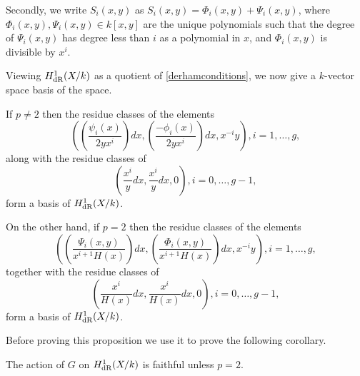 Secondly, we write $S_i(x,y)$ as $S_i(x,y) = \Phi_i(x,y) + \Psi_i(x,y)$, where $\Phi_i(x,y), \Psi_i(x,y) \in k[x,y]$ are the unique polynomials such that the degree of $\Psi_i(x,y)$ has degree less than $i$ as a polynomial in $x$, and $\Phi_i(x,y)$ is divisible by $x^i$.

Viewing $H_{\text {dR}}^1(X/k)$ as a quotient of \eqref{derhamconditions}, we now give a $k$-vector space basis of the space.
\begin{thm}\label{basis}

If $p \neq 2$ then the residue classes of the elements 
\begin{equation}\label{one}
 \left( \left( \frac{\psi_i(x)}{2yx^i}\right) dx, \left(\frac{-\phi_i(x)}{2yx^i}\right) dx, x^{-i}y\right), i=1, \ldots ,g,
\end{equation}
along with the residue classes of 
\begin{equation}\label{two}
 \left( \frac{x^{i}}{y} dx , \frac{x^{i}}{y} dx, 0 \right), i = 0,\ldots ,g-1,
\end{equation}
form a basis of $H_{\text {dR}}^1(X/k)$.

On the other hand, if $p=2$ then the residue classes of the elements 
\begin{equation}\label{three}
\left( \left(\frac{\Psi_i(x,y)}{x^{i+1}H(x)}\right) dx, \left( \frac{\Phi_i(x,y)}{x^{i+1}H(x)} \right) dx, x^{-i}y \right), i =1, \ldots , g,
\end{equation}
together with the residue classes of 
\begin{equation}\label{four}
\left( \frac{x^{i}}{H(x)} dx, \frac{x^{i}}{H(x)} dx, 0 \right), i=0, \ldots, g-1,
\end{equation}
form a basis of $H_{\text {dR}}^1(X/k)$.
\end{thm}

Before proving this proposition we use it to prove the following corollary.

\begin{cor}
The action of $G$ on $H_{\text {dR}}^1(X/k)$ is faithful unless $p=2$.
\end{cor}


